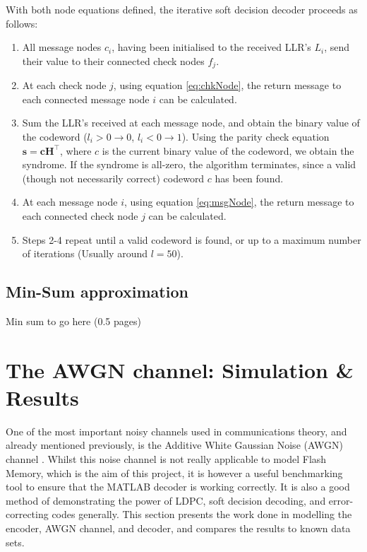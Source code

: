\documentclass[11pt]{article}
\numberwithin{equation}{subsection}
\begin{document}
\noindent With both node equations defined, the iterative soft decision decoder proceeds as follows:

\begin{enumerate}
\item All message nodes $c_i$, having been initialised to the received LLR's $L_i$, send their value to their connected check nodes $f_j$. 
\item At each check node $j$, using equation \ref{eq:chkNode}, the return message to each connected message node $i$ can be calculated.
\item Sum the LLR's received at each message node, and obtain the binary value of the codeword ($l_i > 0 \rightarrow 0$, $l_i < 0 \rightarrow 1$). Using the parity check equation $\mathbf{s=c H}^\top$, where $c$ is the current binary value of the codeword, we obtain the syndrome. If the syndrome is all-zero, the algorithm terminates, since a valid (though not necessarily correct) codeword $c$ has been found.
\item At each message node $i$, using equation \ref{eq:msgNode}, the return message to each connected check node $j$ can be calculated.
\item Steps 2-4 repeat until a valid codeword is found, or up to a maximum number of iterations (Usually around $l=50$). 
\end{enumerate}

\subsection{Min-Sum approximation}

Min sum to go here (0.5 pages)

\section{The AWGN channel: Simulation \& Results}
One of the most important noisy channels used in communications theory, and already mentioned previously, is the Additive White Gaussian Noise (AWGN) channel \cite{johnson2009iterative,tse2005fundamentals,proakis2001digital,haykin2008communication}. Whilst this noise channel is not really applicable to model Flash Memory, which is the aim of this project, it is however a useful benchmarking tool to ensure that the MATLAB decoder is working correctly. It is also a good method of demonstrating the power of LDPC, soft decision decoding, and error-correcting codes generally. This section presents the work done in modelling the encoder, AWGN channel, and decoder, and compares the results to known data sets.
\end{document}
